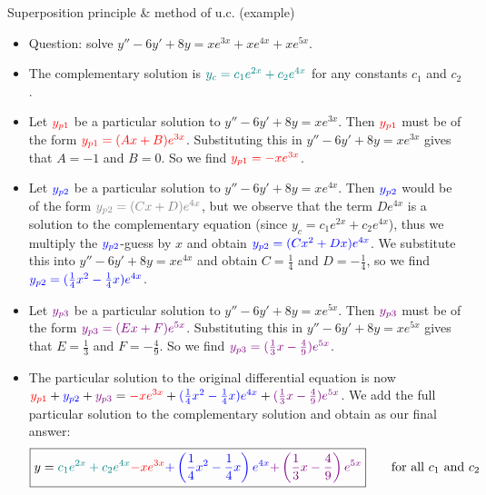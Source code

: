 \begin{frame}{Superposition principle \& method of u.c. (example)}

{\scriptsize
\begin{itemize}
    \item Question: solve $y''-6y'+8y=xe^{3x}+xe^{4x}+xe^{5x}$.
    \item The complementary solution is $\textcolor{teal}{y_c=c_1e^{2x}+c_2e^{4x}}$ for any constants $c_1$ and $c_2$.
    \item Let $\textcolor{red}{y_{p1}}$ be a particular solution to $y''-6y'+8y=xe^{3x}$. Then $\textcolor{red}{y_{p1}}$ must be of the form $\textcolor{red}{y_{p1}=(Ax+B)e^{3x}}$. Substituting this in $y''-6y'+8y=xe^{3x}$ gives that $A=-1$ and $B=0$. So we find $\textcolor{red}{y_{p1}=-xe^{3x}}$.
    \item Let $\textcolor{blue}{y_{p2}}$ be a particular solution to $y''-6y'+8y=xe^{4x}$. Then $\textcolor{blue}{y_{p2}}$ would be of the form $\textcolor{gray}{y_{p2}=(Cx+D)e^{4x}}$, but we observe that the term $De^{4x}$ is a solution to the complementary equation (since $y_c=c_1e^{2x}+c_2e^{4x}$), thus we multiply the $\textcolor{blue}{y_{p2}}$-guess by $x$ and obtain $\textcolor{blue}{y_{p2}=(Cx^2+Dx)e^{4x}}$. We substitute this into $y''-6y'+8y=xe^{4x}$ and obtain $C=\frac{1}{4}$ and $D=-\frac{1}{4}$, so we find $\textcolor{blue}{y_{p2}=(\frac{1}{4}x^2-\frac{1}{4}x)e^{4x}}$.
    \item Let $\textcolor{violet}{y_{p3}}$ be a particular solution to $y''-6y'+8y=xe^{5x}$. Then $\textcolor{violet}{y_{p3}}$ must be of the form $\textcolor{violet}{y_{p3}=(Ex+F)e^{5x}}$. Substituting this in $y''-6y'+8y=xe^{5x}$ gives that $E=\frac{1}{3}$ and $F=-\frac{4}{9}$. So we find $\textcolor{violet}{y_{p3}=(\frac{1}{3}x-\frac{4}{9})e^{5x}}$.
    \item The particular solution to the original differential equation is now $\textcolor{red}{y_{p1}}+\textcolor{blue}{y_{p2}}+\textcolor{violet}{y_{p3}}=\textcolor{red}{-xe^{3x}}+\textcolor{blue}{(\frac{1}{4}x^2-\frac{1}{4}x)e^{4x}}+\textcolor{violet}{(\frac{1}{3}x-\frac{4}{9})e^{5x}}$. We add the full particular solution to the complementary solution and obtain as our final answer:
    \[\boxed{y=\textcolor{teal}{c_1e^{2x}+c_2e^{4x}}\textcolor{red}{-xe^{3x}}\textcolor{blue}{+\left(\frac{1}{4}x^2-\frac{1}{4}x\right)e^{4x}}\textcolor{violet}{+\left(\frac{1}{3}x-\frac{4}{9}\right)e^{5x}}}\qquad\text{for all $c_1$ and $c_2$}\]
    \end{itemize}
}\end{frame}

